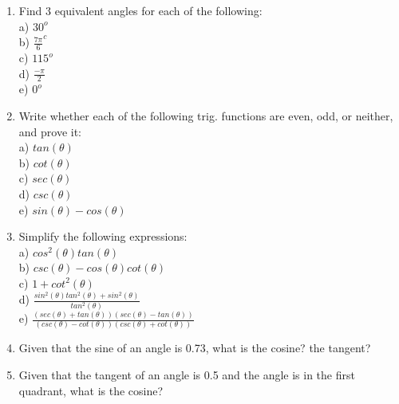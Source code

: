 \begin{enumerate}

\item{Find 3 equivalent angles for each of the following:\\

\tab a) $30^o$\\

\tab b) $\frac{7\pi}{6}^c$\\

\tab c) $115^o$\\

\tab d) $\frac{-\pi}{2}$\\

\tab e) $0^o$\\}

\item{Write whether each of the following trig. functions are even, odd, or neither, and prove it:\\

\tab a) $tan(\theta)$\\

\tab b) $cot(\theta)$\\

\tab c) $sec(\theta)$\\

\tab d) $csc(\theta)$\\

\tab e) $sin(\theta) - cos(\theta)$\\}

\item{Simplify the following expressions:\\

\tab a) $cos^2(\theta)tan(\theta)$\\

\tab b) $csc(\theta) - cos(\theta)cot(\theta)$\\

\tab c) $1 + cot^2(\theta)$\\

\tab d) $\frac{sin^2(\theta)tan^2(\theta) + sin^2(\theta)}{tan^2(\theta)}$\\

\tab e) $\frac{(sec(\theta) + tan(\theta))(sec(\theta) - tan(\theta))}{(csc(\theta) - cot(\theta))(csc(\theta) + cot(\theta))}$\\}

\item{Given that the sine of an angle is 0.73, what is the cosine?  the tangent?\\}

\item{Given that the tangent of an angle is 0.5 and the angle is in the first quadrant, what is the cosine?}

\end{enumerate}

